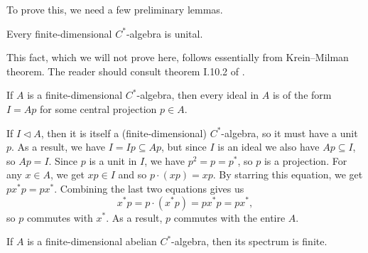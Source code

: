 To prove this, we need a few preliminary lemmas. 

\begin{lemma}
  Every finite-dimensional $C^*$-algebra is unital.
\end{lemma}

This fact, which we will not prove here, follows essentially from Krein--Milman theorem.
The reader should consult theorem I.10.2 of \cite{takesaki}.

\begin{corollary}
  If $A$ is a finite-dimensional $C^*$-algebra, then every ideal in $A$ is of the form $I = A p$
  for some central projection $p \in A$.
\end{corollary}

\begin{myproof}
  If $I \lhd A$, then it is itself a (finite-dimensional) $C^*$-algebra, so it must have a unit $p$.
  As a result, we have $I = Ip \subseteq Ap$, but since $I$ is an ideal we also have
  $Ap \subseteq I$, so $Ap = I$. Since $p$ is a unit in $I$, we have $p^2 = p = p^*$, so $p$ is a projection.
  For any $x \in A$, we get $xp \in I$ and so 
  $p \cdot (xp) = xp$. By starring this equation, we get $p x^* p = p x^*$. Combining the
  last two equations gives us 
  $$x^* p = p \cdot (x^* p) = p x^* p = p x^*,$$
  so $p$ commutes with $x^*$. As a result, $p$ commutes with the entire $A$.
\end{myproof}

\begin{lemma}
  If $A$ is a finite-dimensional abelian $C^*$-algebra, then its spectrum is finite.
\end{lemma}

